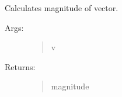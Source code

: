 \documentclass[letterpaper,10pt,english]{sphinxmanual}
\begin{document}
\begin{fulllineitems}
\label{\detokenize{utils:luxpy.utils.math.magnitude_v}}
Calculates magnitude of vector.
\begin{description}
\item[{Args:}] \leavevmode\begin{quote}\begin{description}
\item[{v}] \leavevmode
{}

\end{description}\end{quote}

\item[{Returns:}] \leavevmode\begin{quote}\begin{description}
\item[{magnitude}] \leavevmode
{}

\end{description}\end{quote}

\end{description}

\end{fulllineitems}

\end{document}
